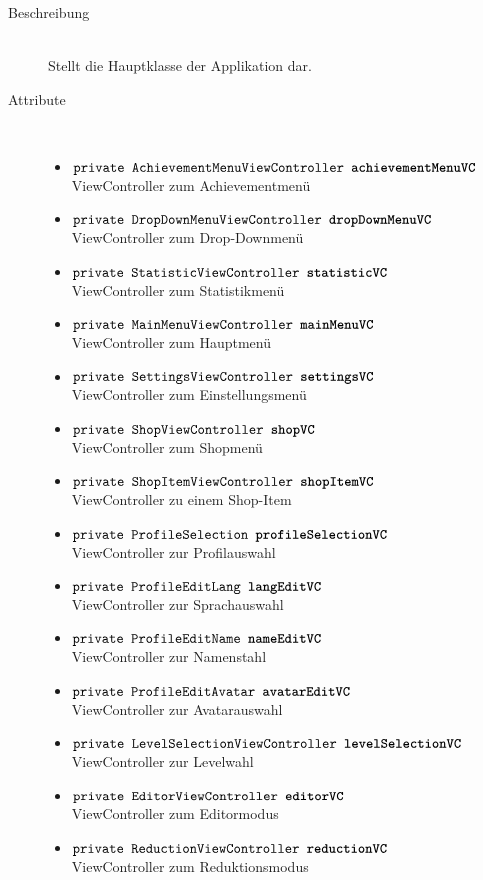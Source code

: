 \begin{description}
\item[Beschreibung] \hfill \\ Stellt die Hauptklasse der Applikation dar.

\item[Attribute] \hfill \\
	\vspace{-.8cm}
	\begin{itemize}
		\item $\texttt{private AchievementMenuViewController \textbf{achievementMenuVC}}$ \\ ViewController zum Achievementmenü
		\item $\texttt{private DropDownMenuViewController \textbf{dropDownMenuVC}}$ \\ ViewController zum Drop-Downmenü
		\item $\texttt{private StatisticViewController \textbf{statisticVC}}$ \\ ViewController zum Statistikmenü
		\item $\texttt{private MainMenuViewController \textbf{mainMenuVC}}$ \\ ViewController zum Hauptmenü
		\item $\texttt{private SettingsViewController \textbf{settingsVC}}$ \\ ViewController zum Einstellungsmenü
		\item $\texttt{private ShopViewController \textbf{shopVC}}$ \\ ViewController zum Shopmenü
		\item $\texttt{private ShopItemViewController \textbf{shopItemVC}}$ \\ ViewController zu einem Shop-Item
		
		\item $\texttt{private ProfileSelection \textbf{profileSelectionVC}}$ \\ ViewController zur Profilauswahl
		\item $\texttt{private ProfileEditLang \textbf{langEditVC}}$ \\ ViewController zur Sprachauswahl
		\item $\texttt{private ProfileEditName \textbf{nameEditVC}}$ \\ ViewController zur Namenstahl
		\item $\texttt{private ProfileEditAvatar \textbf{avatarEditVC}}$ \\ ViewController zur Avatarauswahl
		\item $\texttt{private LevelSelectionViewController \textbf{levelSelectionVC}}$ \\ ViewController zur Levelwahl
		\item $\texttt{private EditorViewController \textbf{editorVC}}$ \\ ViewController zum Editormodus
		\item $\texttt{private ReductionViewController \textbf{reductionVC}}$ \\ ViewController zum Reduktionsmodus
		

\end{itemize}
\end{description}
